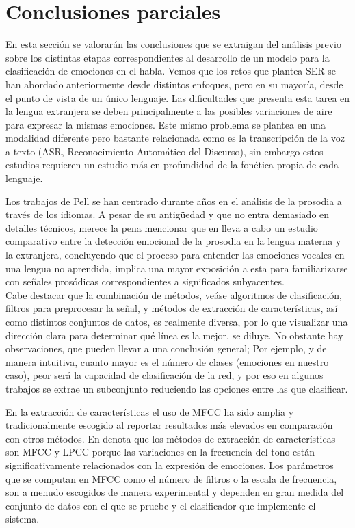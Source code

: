 \documentclass[11pt,a4paper,spanish]{book}
\begin{document}
	\section{Conclusiones parciales}
	En esta sección se valorarán las conclusiones que se extraigan del análisis previo sobre los distintas etapas correspondientes al desarrollo de un modelo para la clasificación de emociones en el habla. Vemos que los retos que plantea SER se han abordado anteriormente desde distintos enfoques, pero en su mayoría, desde el punto de vista de un único lenguaje. Las dificultades que presenta esta tarea en la lengua extranjera se deben principalmente a las posibles variaciones de aire para expresar la mismas emociones. Este mismo problema se plantea en una modalidad diferente pero bastante relacionada como es la transcripción de la voz a texto (ASR, Reconocimiento Automático del Discurso), sin embargo estos estudios requieren un estudio más en profundidad de la fonética propia de cada lenguaje.
	
	Los trabajos de Pell se han centrado durante años en el análisis de la prosodia a través de los idiomas. A pesar de su antigüedad y que no entra demasiado en detalles técnicos, merece la pena mencionar que en \cite{Pell2008} lleva a cabo un estudio comparativo entre la detección emocional de la prosodia en la lengua materna y la extranjera, concluyendo que el proceso para entender las emociones vocales en una lengua no aprendida, implica una mayor exposición a esta para familiarizarse con señales prosódicas correspondientes a significados subyacentes.\\
	
	Cabe destacar que la combinación de métodos, veáse algoritmos de clasificación, filtros para preprocesar la señal, y métodos de extracción de características, así como distintos conjuntos de datos, es realmente diversa, por lo que visualizar una dirección clara para determinar qué línea es la mejor, se diluye. No obstante hay observaciones, que pueden llevar a una conclusión general; Por ejemplo, y de manera intuitiva, cuanto mayor es el número de clases (emociones en nuestro caso), peor será la capacidad de clasificación de la red, y por eso en algunos trabajos se extrae un subconjunto reduciendo las opciones entre las que clasificar.  
	
	En la extracción de características el uso de MFCC ha sido amplia y tradicionalmente escogido al reportar resultados más elevados en comparación con otros métodos. En \cite{Langari2020} denota que los métodos de extracción de características son MFCC y LPCC porque las variaciones en la frecuencia del tono están significativamente relacionados con la expresión de emociones. Los parámetros que se computan en MFCC como el número de filtros o la escala de frecuencia, son a menudo escogidos de manera experimental y dependen en gran medida del conjunto de datos con el que se pruebe y el clasificador que implemente el sistema.
	
\end{document}

